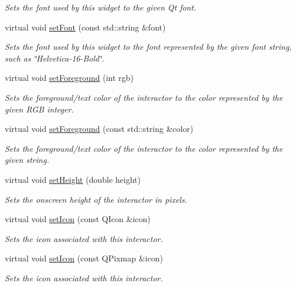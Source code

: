 \begin{DoxyCompactItemize}
\begin{DoxyCompactList}\small\item\em Sets the font used by this widget to the given Qt font. \end{DoxyCompactList}\item 
virtual void \mbox{\hyperlink{classGInteractor_a8e096e8818d838aceae1d46d58fb3a7b}{set\+Font}} (const std\+::string \&font)
\begin{DoxyCompactList}\small\item\em Sets the font used by this widget to the font represented by the given font string, such as \char`\"{}\+Helvetica-\/16-\/\+Bold\char`\"{}. \end{DoxyCompactList}\item 
virtual void \mbox{\hyperlink{classGInteractor_a9eb856b5ff83a19df3831a31f15f4563}{set\+Foreground}} (int rgb)
\begin{DoxyCompactList}\small\item\em Sets the foreground/text color of the interactor to the color represented by the given R\+GB integer. \end{DoxyCompactList}\item 
virtual void \mbox{\hyperlink{classGInteractor_af59209aeadea6dfc6d97a2d8531f50e1}{set\+Foreground}} (const std\+::string \&color)
\begin{DoxyCompactList}\small\item\em Sets the foreground/text color of the interactor to the color represented by the given string. \end{DoxyCompactList}\item 
virtual void \mbox{\hyperlink{classGInteractor_a9e280bfc4544dfaf8e4376c4e1a74357}{set\+Height}} (double height)
\begin{DoxyCompactList}\small\item\em Sets the onscreen height of the interactor in pixels. \end{DoxyCompactList}\item 
virtual void \mbox{\hyperlink{classGInteractor_a542abfcd7261751352af129c7215ecda}{set\+Icon}} (const Q\+Icon \&icon)
\begin{DoxyCompactList}\small\item\em Sets the icon associated with this interactor. \end{DoxyCompactList}\item 
virtual void \mbox{\hyperlink{classGInteractor_a368e1a338f84401c284506d03b1ba769}{set\+Icon}} (const Q\+Pixmap \&icon)
\begin{DoxyCompactList}\small\item\em Sets the icon associated with this interactor. \end{DoxyCompactList}\item 

\end{DoxyCompactItemize}
